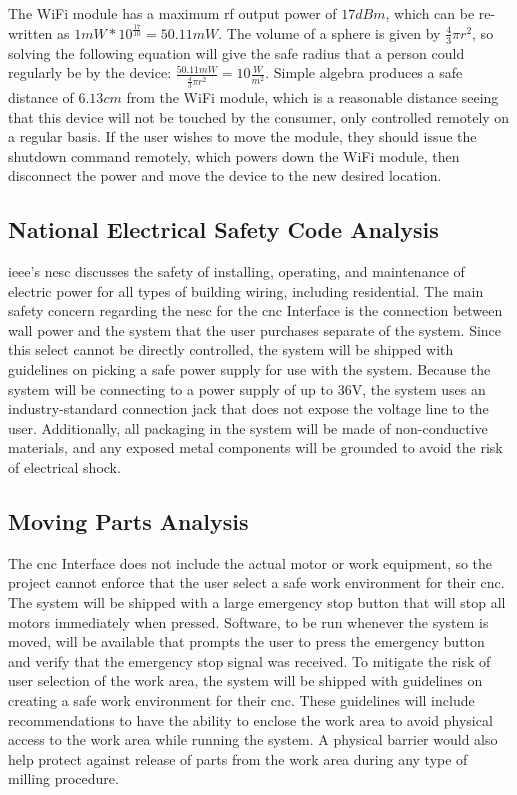The WiFi module has a maximum \gls{rf} output power of $17dBm$, which can be re-written as $1mW*10^{\frac{17}{10}}=50.11mW$.
The volume of a sphere is given by $\frac{4}{3}\pi r^2$, so solving the following equation will give the safe radius that a person could regularly be by the device: $\frac{50.11mW}{\frac{4}{3}\pi r^2}=10\frac{W}{m^2}$.
Simple algebra produces a safe distance of $6.13cm$ from the WiFi module, which is a reasonable distance seeing that this device will not be touched by the consumer, only controlled remotely on a regular basis. 
If the user wishes to move the module, they should issue the shutdown command remotely, which powers down the WiFi module, then disconnect the power and move the device to the new desired location.

\subsection{National Electrical Safety Code Analysis}
\gls{ieee}'s \gls{nesc}\cite{ieeenesc} discusses the safety of installing, operating, and maintenance of electric power for all types of building wiring, including residential.
The main safety concern regarding the \gls{nesc} for the \gls{cnc} Interface is the connection between wall power and the system that the user purchases separate of the system.
Since this select cannot be directly controlled, the system will be shipped with guidelines on picking a safe power supply for use with the system.
Because the system will be connecting to a power supply of up to 36V, the system uses an industry-standard connection jack that does not expose the voltage line to the user.
Additionally, all packaging in the system will be made of non-conductive materials, and any exposed metal components will be grounded to avoid the risk of electrical shock\cite{ieeenesc}.

\subsection{Moving Parts Analysis}
The \gls{cnc} Interface does not include the actual motor or work equipment, so the project cannot enforce that the user select a safe work environment for their \gls{cnc}.
The system will be shipped with a large emergency stop button that will stop all motors immediately when pressed.
Software, to be run whenever the system is moved, will be available that prompts the user to press the emergency button and verify that the emergency stop signal was received.
To mitigate the risk of user selection of the work area, the system will be shipped with guidelines on creating a safe work environment for their \gls{cnc}.
These guidelines will include recommendations to have the ability to enclose the work area to avoid physical access to the work area while running the system.
A physical barrier would also help protect against release of parts from the work area during any type of milling procedure.


